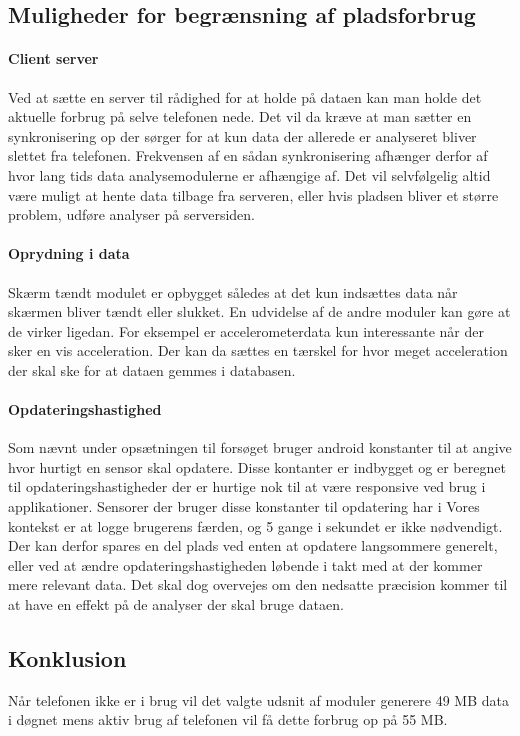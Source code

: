 \subsection{Muligheder for begrænsning af pladsforbrug}

\paragraph{Client server}
Ved at sætte en server til rådighed for at holde på dataen kan man holde det aktuelle forbrug på selve telefonen nede.
Det vil da kræve at man sætter en synkronisering op der sørger for at kun data der allerede er analyseret bliver slettet fra telefonen. 
Frekvensen af en sådan synkronisering afhænger derfor af hvor lang tids data analysemodulerne er afhængige af.
Det vil selvfølgelig altid være muligt at hente data tilbage fra serveren, eller hvis pladsen bliver et større problem, udføre analyser på serversiden.

\paragraph{Oprydning i data}
Skærm tændt modulet er opbygget således at det kun indsættes data når skærmen bliver tændt eller slukket.
En udvidelse af de andre moduler kan gøre at de virker ligedan. 
For eksempel er accelerometerdata kun interessante når der sker en vis acceleration.
Der kan da sættes en tærskel for hvor meget acceleration der skal ske for at dataen gemmes i databasen.

\paragraph{Opdateringshastighed}
Som nævnt under opsætningen til forsøget bruger android konstanter til at angive hvor hurtigt en sensor skal opdatere.
Disse kontanter er indbygget og er beregnet til opdateringshastigheder der er hurtige nok til at være responsive ved brug i applikationer.
Sensorer der bruger disse konstanter til opdatering har i 
Vores kontekst er at logge brugerens færden, og 5 gange i sekundet er ikke nødvendigt.
Der kan derfor spares en del plads ved enten at opdatere langsommere generelt, eller ved at ændre opdateringshastigheden løbende i takt med at der kommer mere relevant data.
Det skal dog overvejes om den nedsatte præcision kommer til at have en effekt på de analyser der skal bruge dataen.

\subsection{Konklusion}
Når telefonen ikke er i brug vil det valgte udsnit af moduler generere 49 MB data i døgnet mens aktiv brug af telefonen vil få dette forbrug op på 55 MB.

